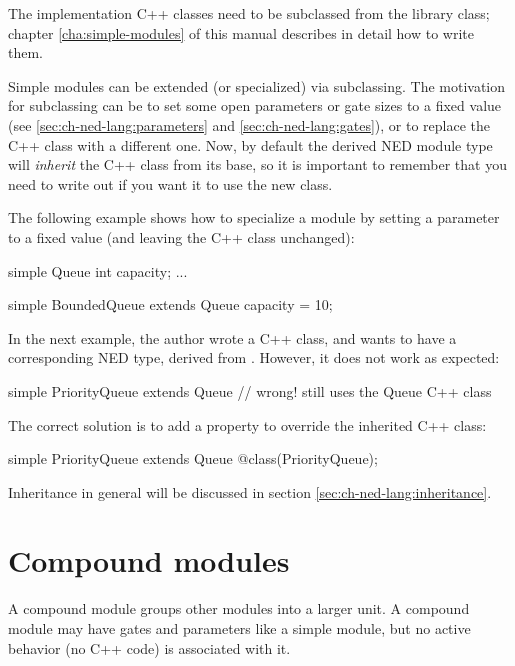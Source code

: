 The implementation C++ classes need to be subclassed from the
 library class; chapter \ref{cha:simple-modules} of
this manual describes in detail how to write them.

Simple modules can be extended (or specialized) via subclassing. The
motivation for subclassing can be to set some open parameters or gate sizes
to a fixed value (see \ref{sec:ch-ned-lang:parameters} and
\ref{sec:ch-ned-lang:gates}), or to replace the C++ class with a different
one. Now, by default the derived NED module type will \textit{inherit} the
C++ class from its base, so it is important to remember that you need to
write out  if you want it to use the new class.

The following example shows how to specialize a module by setting a parameter
to a fixed value (and leaving the C++ class unchanged):

\begin{ned}
simple Queue
{
   int capacity;
   ...
}

simple BoundedQueue extends Queue
{
   capacity = 10;
}
\end{ned}

In the next example, the author wrote a  C++ class, and
wants to have a corresponding NED type, derived from . However,
it does not work as expected:

\begin{ned}
simple PriorityQueue extends Queue // wrong! still uses the Queue C++ class
{
}
\end{ned}

The correct solution is to add a  property to override the
inherited C++ class:

\begin{ned}
simple PriorityQueue extends Queue
{
   @class(PriorityQueue);
}
\end{ned}

Inheritance in general will be discussed in section \ref{sec:ch-ned-lang:inheritance}.



\section{Compound modules}
\label{sec:ch-ned-lang:compound-modules}

A compound module groups other modules into a larger unit. A compound
module may have gates and parameters like a simple module, but
no active behavior (no C++ code) is associated with it.

